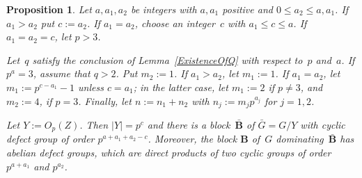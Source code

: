 \documentclass[12pt]{amsart}
\newcommand{\bB}{{\mathbf{B}}}
\newtheorem{prop}[thm]{Proposition}
\theoremstyle{theorem}
\theoremstyle{definition}
\theoremstyle{remark}
\begin{document}
\begin{prop}
\label{Existence2PropA}
Let $a, a_1, a_2$ be integers with $a, a_1$ positive and 
$0 \leq a_2 \leq a, a_1$. If $a_1 > a_2$ put $c := a_2$. If $a_1 = a_2$, choose 
an integer~$c$ with $a_1 \leq c \leq a$. If $a_1 = a_2 = c$, let $p > 3$.

Let~$q$ satisfy the conclusion of {\rm Lemma~\ref{ExistenceOfQ}} with respect 
to~$p$ and~$a$. If $p^a = 3$, assume that $q > 2$. Put $m_2 := 1$. If 
$a_1 > a_2$, let $m_1 := 1$. If $a_1 = a_2$, let $m_1 := p^{c-a_1} - 1$ unless 
$c = a_1$; in the latter case, let $m_1 := 2$ if $p \neq 3$, and $m_2 := 4$, if 
$p = 3$.  Finally, let $n := n_1 + n_2$ with $n_j := m_jp^{a_j}$ for $j = 1, 2$.

Let $Y := O_p( Z )$. Then $|Y| = p^c$ and there is a block~$\bar{\bB}$ of 
$\bar{G} = G/Y$ with cyclic defect group of order $p^{a + a_1 + a_2 - c}$. 
Moreover, the block $\bB$ of~$G$ dominating~$\bar{\bB}$ has abelian defect 
groups, which are direct products of two cyclic groups of order $p^{a+a_1}$ 
and $p^{a_2}$.
\end{prop}
\end{document}

